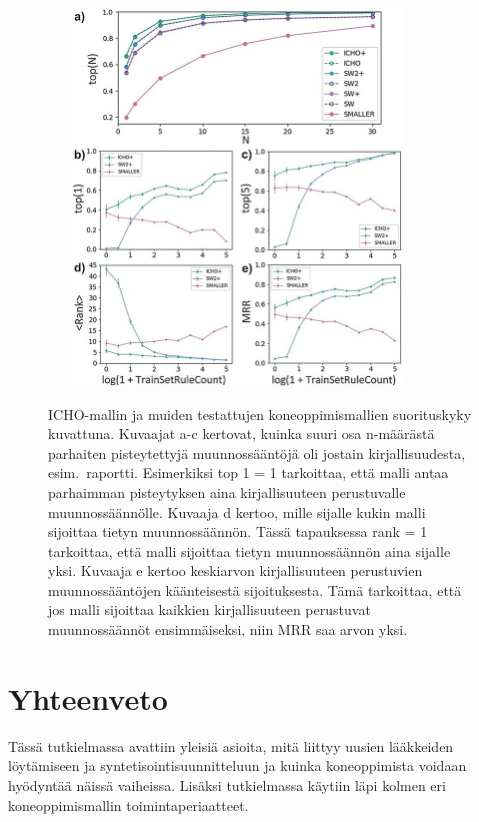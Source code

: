 \documentclass[finnish,twoside,censored,tkt,sw-line]{HYthesisML}
\begin{document}
\begin{figure}[!ht]
    \centering
    \includegraphics[width=10cm, height=10cm]{icho-performance-fig.jpg}
    \caption{
        ICHO-mallin ja muiden testattujen koneoppimismallien suorituskyky kuvattuna.
        Kuvaajat a-c kertovat, kuinka suuri osa n-määrästä parhaiten pisteytettyjä muunnossääntöjä oli jostain kirjallisuudesta, esim.\ raportti.
        Esimerkiksi top 1 = 1 tarkoittaa, että malli antaa parhaimman pisteytyksen aina kirjallisuuteen perustuvalle muunnossäännölle.
        Kuvaaja d kertoo, mille sijalle kukin malli sijoittaa tietyn muunnossäännön.
        Tässä tapauksessa rank = 1 tarkoittaa, että malli sijoittaa tietyn muunnossäännön aina sijalle yksi.
        Kuvaaja e kertoo keskiarvon kirjallisuuteen perustuvien muunnossääntöjen käänteisestä sijoituksesta.
        Tämä tarkoittaa, että jos malli sijoittaa kaikkien kirjallisuuteen perustuvat muunnossäännöt ensimmäiseksi, niin MRR saa arvon yksi.
    }
    {\cite{ExpertKnowledgeRetorsynthesis}}
    {\label{fig:icho-performance}}
\end{figure}

\chapter{Yhteenveto}

Tässä tutkielmassa avattiin yleisiä asioita, mitä liittyy uusien lääkkeiden löytämiseen ja syntetisointisuunnitteluun ja kuinka koneoppimista voidaan hyödyntää näissä vaiheissa.
Lisäksi tutkielmassa käytiin läpi kolmen eri koneoppimismallin toimintaperiaatteet.
\end{document}
